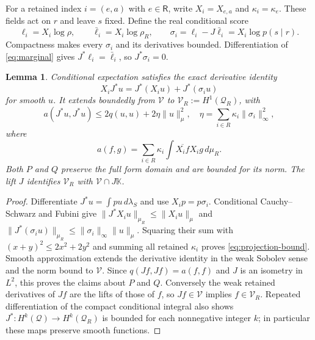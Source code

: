 \documentclass[11pt]{article}
\newtheorem{lemma}[theorem]{Lemma}
\begin{document}
For a retained index $i=(e,a)$ with $e\in\mathsf R$, write $X_i=X_{e,a}$
and $\kappa_i=\kappa_e$. These fields act on $r$ and leave $s$ fixed.
Define the real conditional score
\begin{equation}\label{eq:score}
 \ell_i=X_i\log\rho,\qquad
 \bar\ell_i=X_i\log\rho_R,\qquad
 \sigma_i=\ell_i-J\bar\ell_i=X_i\log p(s\mid r).
\end{equation}
Compactness makes every $\sigma_i$ and its derivatives bounded.
Differentiation of \eqref{eq:marginal} gives
$J^*\ell_i=\bar\ell_i$, so $J^*\sigma_i=0$.

\begin{lemma}\label{lem:projection-domain}
Conditional expectation satisfies the exact derivative identity
\begin{equation}\label{eq:conditional-derivative}
 X_iJ^*u=J^*(X_i u)+J^*(\sigma_i u)
\end{equation}
for smooth $u$. It extends boundedly from $\mathcal V$ to
$\mathcal V_R:=H^1(\mathcal Q_R)$, with
\begin{equation}\label{eq:projection-bound}
 a(J^*u,J^*u)\leq2q(u,u)+2\eta\|u\|_\mu^2,
 \quad
 \eta=\sum_{i\in R}\kappa_i\|\sigma_i\|_\infty^2,
\end{equation}
where
\begin{equation}\label{eq:reducedform}
 a(f,g)=\sum_{i\in R}\kappa_i\int\overline{X_if}X_ig\,d\mu_R.
\end{equation}
Both $P$ and $Q$ preserve the full form domain and are bounded for its
norm. The lift $J$ identifies $\mathcal V_R$ with
$\mathcal V\cap J\mathbb K$.
\end{lemma}
\begin{proof}
Differentiate $J^*u=\int p u\,d\lambda_S$ and use $X_ip=p\sigma_i$.
Conditional Cauchy--Schwarz and Fubini give
$\|J^*X_iu\|_{\mu_R}\leq\|X_iu\|_\mu$ and
$\|J^*(\sigma_i u)\|_{\mu_R}\leq\|\sigma_i\|_\infty\|u\|_\mu$.
Squaring their sum with $(x+y)^2\leq2x^2+2y^2$ and summing all
retained $\kappa_i$ proves \eqref{eq:projection-bound}.
Smooth approximation extends the derivative identity in the weak
Sobolev sense and the norm bound to $\mathcal V$. Since
$q(Jf,Jf)=a(f,f)$ and $J$ is an isometry in $L^2$, this proves the
claims about $P$ and $Q$. Conversely the weak retained derivatives of
$Jf$ are the lifts of those of $f$, so $Jf\in\mathcal V$ implies
$f\in\mathcal V_R$. Repeated differentiation of the compact conditional
integral also shows $J^*:H^k(\mathcal Q)\to H^k(\mathcal Q_R)$ is
bounded for each nonnegative integer $k$; in particular these maps
preserve smooth functions.
\end{proof}
\end{document}
